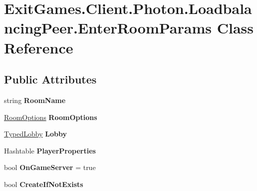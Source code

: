 \hypertarget{class_exit_games_1_1_client_1_1_photon_1_1_loadbalancing_peer_1_1_enter_room_params}{}\section{Exit\+Games.\+Client.\+Photon.\+Loadbalancing\+Peer.\+Enter\+Room\+Params Class Reference}
\label{class_exit_games_1_1_client_1_1_photon_1_1_loadbalancing_peer_1_1_enter_room_params}
\subsection*{Public Attributes}
\begin{DoxyCompactItemize}
\item 
string {\bfseries Room\+Name}\hypertarget{class_exit_games_1_1_client_1_1_photon_1_1_loadbalancing_peer_1_1_enter_room_params_a72afef2017538b11abfaac5d14f2b176}{}\label{class_exit_games_1_1_client_1_1_photon_1_1_loadbalancing_peer_1_1_enter_room_params_a72afef2017538b11abfaac5d14f2b176}

\item 
\hyperlink{class_room_options}{Room\+Options} {\bfseries Room\+Options}\hypertarget{class_exit_games_1_1_client_1_1_photon_1_1_loadbalancing_peer_1_1_enter_room_params_ac6674e44fe94492bf0d12bf6458c0444}{}\label{class_exit_games_1_1_client_1_1_photon_1_1_loadbalancing_peer_1_1_enter_room_params_ac6674e44fe94492bf0d12bf6458c0444}

\item 
\hyperlink{class_typed_lobby}{Typed\+Lobby} {\bfseries Lobby}\hypertarget{class_exit_games_1_1_client_1_1_photon_1_1_loadbalancing_peer_1_1_enter_room_params_a1ce2f0a94f4aab598b206be09737eed0}{}\label{class_exit_games_1_1_client_1_1_photon_1_1_loadbalancing_peer_1_1_enter_room_params_a1ce2f0a94f4aab598b206be09737eed0}

\item 
Hashtable {\bfseries Player\+Properties}\hypertarget{class_exit_games_1_1_client_1_1_photon_1_1_loadbalancing_peer_1_1_enter_room_params_a8f44933e23de1234e376a99b9f8a9a90}{}\label{class_exit_games_1_1_client_1_1_photon_1_1_loadbalancing_peer_1_1_enter_room_params_a8f44933e23de1234e376a99b9f8a9a90}

\item 
bool {\bfseries On\+Game\+Server} = true\hypertarget{class_exit_games_1_1_client_1_1_photon_1_1_loadbalancing_peer_1_1_enter_room_params_a3cc694d9421937d423e426396f765bbc}{}\label{class_exit_games_1_1_client_1_1_photon_1_1_loadbalancing_peer_1_1_enter_room_params_a3cc694d9421937d423e426396f765bbc}

\item 
bool {\bfseries Create\+If\+Not\+Exists}\hypertarget{class_exit_games_1_1_client_1_1_photon_1_1_loadbalancing_peer_1_1_enter_room_params_a56bbfc86a4c69a7b15aa0efdee059c4e}{}\label{class_exit_games_1_1_client_1_1_photon_1_1_loadbalancing_peer_1_1_enter_room_params_a56bbfc86a4c69a7b15aa0efdee059c4e}

\end{DoxyCompactItemize}


